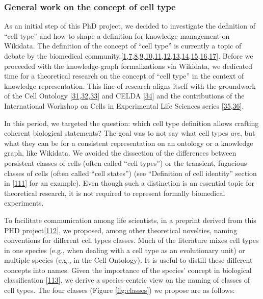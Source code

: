 \hypertarget{general-work-on-the-concept-of-cell-type}{%
\subsubsection{General work on the concept of cell type}\label{general-work-on-the-concept-of-cell-type}}

As an initial step of this PhD project, we decided to investigate the definition of ``cell type'' and how to shape a definition for knowledge management on Wikidata.
The definition of the concept of ``cell type'' is currently a topic of debate by the biomedical community.{[}\protect\hyperlink{ref-pNGap1Du}{1},\protect\hyperlink{ref-paKiKTRS}{7},\protect\hyperlink{ref-sWv3okaH}{8},\protect\hyperlink{ref-19yYJWEkz}{9},\protect\hyperlink{ref-BlxFp1v3}{10},\protect\hyperlink{ref-eOUB1Bmj}{11},\protect\hyperlink{ref-TupzTvtA}{12},\protect\hyperlink{ref-w0Woz7JE}{13},\protect\hyperlink{ref-srfuRMe}{14},\protect\hyperlink{ref-1GXQByEaQ}{15},\protect\hyperlink{ref-k0Pe9YOB}{16},\protect\hyperlink{ref-MoaYZAA0}{17}{]}.
Before we proceeded with the knowledge-graph formalizations via Wikidata, we dedicated time for a theoretical research on the concept of ``cell type'' in the context of knowledge representation.
This line of research aligns itself with the groundwork of the Cell Ontology {[}\protect\hyperlink{ref-1CI8uS6ka}{31},\protect\hyperlink{ref-gAysgnsS}{32},\protect\hyperlink{ref-17U3pGEjv}{33}{]} and CELDA {[}\protect\hyperlink{ref-RLHsA1U8}{34}{]} and the contributions of the International Workshop on Cells in Experimental Life Sciences series {[}\protect\hyperlink{ref-jX2ZmXcc}{35},\protect\hyperlink{ref-rK8KD0us}{36}{]}.

In this period, we targeted the question: which cell type definition allows crafting coherent biological statements?
The goal was to not say what cell types \emph{are}, but what they can be for a consistent representation on an ontology or a knowledge graph, like Wikidata.
We avoided the dissection of the differences between persistent classes of cells (often called ``cell types'') or the transient, fugacious classes of cells (often called ``cell states'') (see ``Definition of cell identity'' section in {[}\protect\hyperlink{ref-pFijpXkl}{111}{]} for an example).
Even though such a distinction is an essential topic for theoretical research, it is not required to represent formally biomedical experiments.

To facilitate communication among life scientists, in a preprint derived from this PHD project{[}\protect\hyperlink{ref-uCE45Jh8}{112}{]}, we proposed, among other theoretical novelties, naming conventions for different cell types classes.
Much of the literature mixes cell types in one species (e.g., when dealing with a cell type as an evolutionary unit) or multiple species (e.g., in the Cell Ontology).
It is useful to distill these different concepts into names. Given the importance of the species' concept in biological classification {[}\protect\hyperlink{ref-AHGRV6KQ}{113}{]}, we derive a species-centric view on the naming of classes of cell types.
The four classes (Figure \ref{fig:classes}) we propose are as follows:

